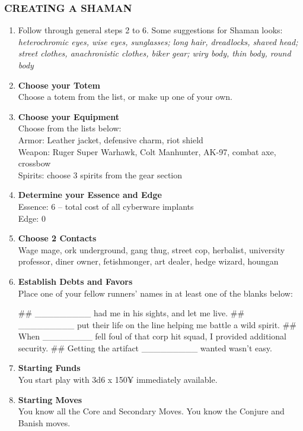 \subsubsection{CREATING A SHAMAN}
\begin{enumerate}
    \item Follow through general steps 2 to 6. Some suggestions for Shaman looks: \textit{heterochromic eyes, wise eyes, sunglasses; long hair, dreadlocks, shaved head; street clothes, anachronistic clothes, biker gear; wiry body, thin body, round body}
    
    \item \textbf{Choose your Totem} \\
    Choose a totem from the list, or make up one of your own.
    
    \item \textbf{Choose your Equipment} \\
    Choose from the lists below: \\
        Armor: Leather jacket, defensive charm, riot shield \\
        Weapon: Ruger Super Warhawk, Colt Manhunter, AK-97, combat axe, crossbow \\
        Spirits: choose 3 spirits from the gear section
    
    \item \textbf{Determine your Essence and Edge} \\
    Essence: 6 – total cost of all cyberware implants \\
    Edge: 0
    
    \item \textbf{Choose 2 Contacts} \\
    Wage mage, ork underground, gang thug, street cop, herbalist, university professor, diner owner, fetishmonger, art dealer, hedge wizard, houngan
    
    \item \textbf{Establish Debts and Favors} \\
    Place one of your fellow runners’ names in at least one of the blanks below:
        \begin{easylist}
            ## \_\_\_\_\_\_\_\_\_ had me in his sights, and let me live.
            ## \_\_\_\_\_\_\_\_\_ put their life on the line helping me battle a wild spirit.
            ## When \_\_\_\_\_\_\_\_ fell foul of that corp hit squad, I provided additional security.
            ## Getting the artifact \_\_\_\_\_\_\_\_\_ wanted wasn’t easy.
        \end{easylist}
    
    \item \textbf{Starting Funds} \\
    You start play with 3d6 x 150¥ immediately available.
    
    \item \textbf{Starting Moves} \\
    You know all the Core and Secondary Moves. You know the Conjure and Banish moves.
\end{enumerate}

